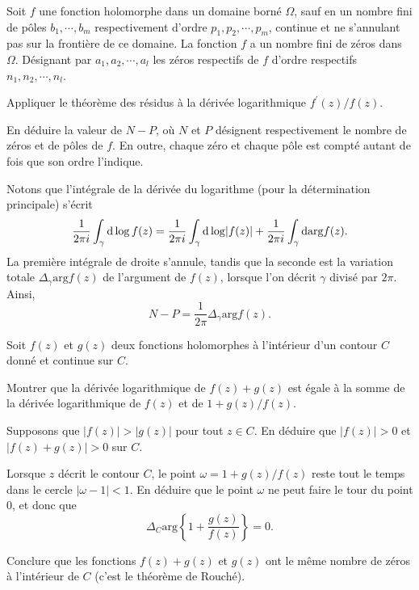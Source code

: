 \begin{exer}
Soit $f$ une fonction holomorphe dans un domaine borné $\Omega$, sauf en un nombre fini de pôles $b_1,\cdots, b_m$ respectivement d'ordre $p_1, p_2, \cdots, p_m$, continue et ne s'annulant pas sur la frontière de ce domaine. La fonction $f$ a un nombre fini de zéros dans $\Omega$. Désignant par $a_1, a_2, \cdots, a_l$ les zéros respectifs de $f$ d'ordre respectifs $n_1,n_2,\cdots, n_l$.      
\begin{MYenumerate}
\item Appliquer le théorème des résidus à la dérivée logarithmique $f^\prime(z)/f(z)$.
\item En déduire la valeur de $N-P$, où $N$ et $P$ désignent respectivement le nombre de zéros et de pôles de $f$. En outre, chaque zéro et chaque pôle est compté autant de fois que son ordre l'indique.
\end{MYenumerate}
Notons que l'intégrale de la dérivée du logarithme (pour la détermination principale) s'écrit
\[\frac{1}{2 \pi i} \int_\gamma \mathop{}\mathopen{}\mathrm{d} \log f(z)  = \frac{1}{2 \pi i} \int_\gamma \mathop{}\mathopen{}\mathrm{d} \log \lvert f(z)\rvert +\frac{1}{2 \pi i} \int_\gamma \mathop{}\mathopen{}\mathrm{d} \text{arg} f(z).\]
La première intégrale de droite s'annule, tandis que la seconde est la variation totale $\Delta_\gamma \text{arg}f(z)$ de l'argument de $f(z)$, lorsque l'on décrit $\gamma$ divisé par $2 \pi$. Ainsi,
\[N-P=\frac{1}{2 \pi }\Delta_\gamma \text{arg}f(z).\]
\end{exer}

\begin{exer}
Soit $f(z)$ et $g(z)$ deux fonctions holomorphes à l'intérieur d'un contour $C$ donné et continue sur $C$.
\begin{MYenumerate}
\item Montrer que la dérivée logarithmique de $f(z)+g(z)$ est égale à la somme de la dérivée logarithmique de $f(z)$ et de $1+ g(z)/f(z)$.
\item Supposons que $\lvert f(z) \rvert > \lvert g(z) \rvert$ pour tout $z \in C$. En déduire que $\lvert f(z) \rvert > 0$ et $\lvert f(z) + g(z)\rvert >0$ sur $C$.
\item Lorsque $z$ décrit le contour $C$, le point $\omega=1+ g(z)/f(z)$ reste tout le temps dans le cercle $\lvert \omega -1 \rvert <1$. En déduire que le point $\omega$ ne peut faire le tour du point $0$, et donc que 
\[\Delta_C \text{arg}\left\{1 + \frac{g(z)}{f(z)}\right\}=0.\]
\item Conclure que les fonctions $f(z)+g(z)$ et $g(z)$ ont le même nombre de zéros à l'intérieur de $C$ (c'est le théorème de Rouché).
\end{MYenumerate}
\end{exer}


